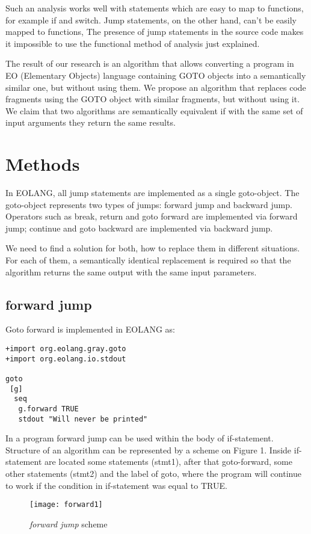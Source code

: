 \documentclass[two column]{article}
\begin{document}
Such an analysis works well with statements which are easy to map to functions, for example if and switch. Jump statements, on the other hand, can't be easily mapped to functions, The presence of jump statements in the source code makes it impossible to use the functional method of analysis just explained.

The result of our research is an algorithm that allows converting a program in EO (Elementary Objects) language containing GOTO objects into a semantically similar one, but without using them.
We propose an algorithm that replaces code fragments using the GOTO object with similar fragments, but without using it. We claim that two algorithms are semantically equivalent if with the same set of input arguments they return the same results.

\section{Methods}
In EOLANG, all jump statements are implemented as a single goto-object. The goto-object represents two types of jumps: forward jump and backward jump.
Operators such as break, return and goto forward are implemented via forward jump; continue and goto backward are implemented via backward jump.

We need to find a solution for both, how to replace them in different situations. For each of them, a semantically identical replacement is required so that the algorithm returns the same output with the same input parameters. 

\subsection{forward jump}
Goto forward is implemented in EOLANG as:
\begin{lstlisting}
+import org.eolang.gray.goto
+import org.eolang.io.stdout

goto
 [g]
  seq
   g.forward TRUE
   stdout "Will never be printed"
\end{lstlisting}

In a program forward jump can be used within the body of if-statement. Structure of an algorithm can be represented by a scheme on Figure 1. Inside if-statement are located some statements (stmt1), after that goto-forward, some other statements (stmt2) and the label of goto, where the program will continue to work if the condition in if-statement was equal to TRUE.

\begin{figure}
    \centering
    \texttt{[image: forward1]}
    \caption{\textit{forward jump} scheme}
    \label{fig:my_label}
\end{figure}
\end{document}
